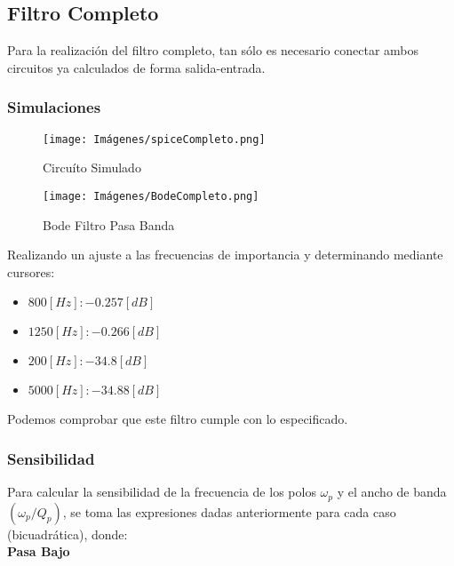     
    \newpage
    \subsection{Filtro Completo}
    Para la realización del filtro completo, tan sólo es necesario conectar ambos circuitos ya calculados de forma salida-entrada.\\
    
    \subsubsection{Simulaciones}

    \begin{figure}[ht]
        \centering
        \texttt{[image: Imágenes/spiceCompleto.png]}
        \caption{Circuíto Simulado}
    \end{figure}
    
    \begin{figure}[ht]
        \centering
        \texttt{[image: Imágenes/BodeCompleto.png]}
        \caption{Bode Filtro Pasa Banda}
    \end{figure}

    Realizando un ajuste a las frecuencias de importancia y determinando mediante cursores:\\

    \begin{itemize}
        \item $800[Hz]: -0.257 [dB]$
        \item $1250[Hz]: -0.266 [dB]$
        \item $200[Hz]: -34.8 [dB]$
        \item $5000[Hz]: -34.88 [dB]$
    \end{itemize}

    Podemos comprobar que este filtro cumple con lo especificado.\\
    
    
    \subsubsection{Sensibilidad}
    Para calcular la sensibilidad de la frecuencia de los polos $\omega_p$ y el ancho de banda $(\omega_p/Q_p)$, se toma las expresiones dadas anteriormente para cada caso (bicuadrática), donde:\\

    \Large{\textbf{Pasa Bajo}}
    
    \begin{center}
    \end{center}

